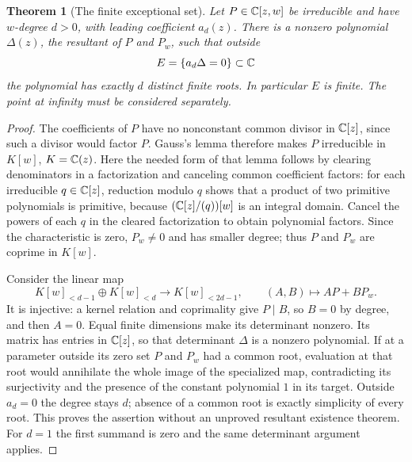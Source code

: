 \documentclass[11pt,a4paper,openany]{book}
\newtheorem{theorem}{Theorem}[chapter]
\theoremstyle{definition}
\theoremstyle{remark}\newtheorem{remark}[theorem]{Remark}
\newcommand{\family}[1]{}
\begin{document}
\begin{theorem}[The finite exceptional set]\label{d12:21-02}\family{D12.21.02}
Let $P\in\mathbb C[z,w]$ be irreducible and have $w$-degree $d>0$, with leading
coefficient $a_d(z)$. There is a nonzero polynomial $\Delta(z)$, the
resultant of $P$ and $P_w$, such that outside
\[
                    E=\{a_d\Delta=0\}\subset\mathbb C
\]
the polynomial has exactly $d$ distinct finite roots. In particular $E$
is finite. The point at infinity must be considered separately.
\end{theorem}
\begin{proof}
The coefficients of $P$ have no nonconstant common divisor in $\mathbb C[z]$,
since such a divisor would factor $P$. Gauss's lemma therefore makes
$P$ irreducible in $K[w]$, $K=\mathbb C(z)$. Here the needed form of that lemma
follows by clearing denominators in a factorization and canceling common
coefficient factors: for each irreducible $q\in\mathbb C[z]$, reduction modulo
$q$ shows that a product of two primitive polynomials is primitive,
because $(\mathbb C[z]/(q))[w]$ is an integral domain. Cancel the powers of
each $q$ in the cleared factorization to obtain polynomial factors.
Since the characteristic is zero, $P_w\ne0$ and has smaller degree;
thus $P$ and $P_w$ are coprime in $K[w]$.

Consider the linear map
\[
 K[w]_{<d-1}\oplus K[w]_{<d}\longrightarrow K[w]_{<2d-1},
                         \qquad(A,B)\longmapsto AP+BP_w.
\]
It is injective: a kernel relation and coprimality give $P\mid B$, so
$B=0$ by degree, and then $A=0$. Equal finite dimensions make its
determinant nonzero. Its matrix has entries in $\mathbb C[z]$, so that determinant
$\Delta$ is a nonzero polynomial. If at a parameter outside its zero set
$P$ and $P_w$ had a common root, evaluation at that root would annihilate
the whole image of the specialized map, contradicting its surjectivity
and the presence of the constant polynomial $1$ in its target. Outside
$a_d=0$ the degree stays $d$; absence of a common root is exactly
simplicity of every root. This proves the assertion without an unproved
resultant existence theorem. For $d=1$ the first summand is zero and
the same determinant argument applies.
\end{proof}
\end{document}
